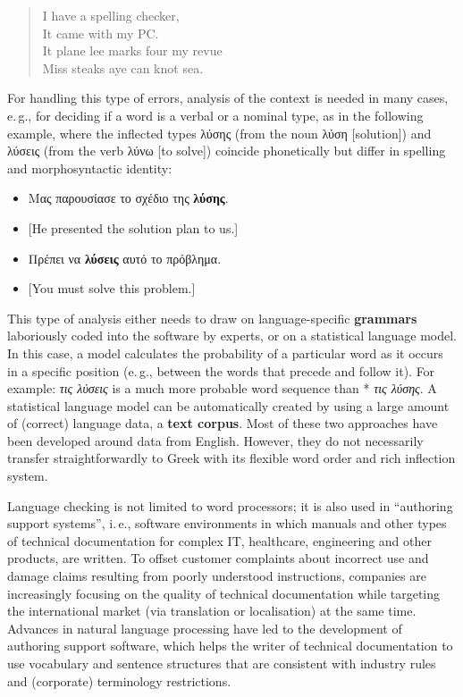 \documentclass[]{../../metanetpaper}
\begin{document}
\begin{multicols}{2}
\begin{quote}
  I have a spelling checker,\\
  It came with my PC.\\
  It plane lee marks four my revue\\
  Miss steaks aye can knot sea.
\end{quote}

For handling this type of errors, analysis of the context is needed in many cases, e.\,g., for deciding if a word is a verbal or a nominal type, as in the following example, where the inflected types λύσης (from the noun λύση [solution]) and λύσεις (from the verb λύνω [to solve]) coincide phonetically but differ in spelling and morphosyntactic identity:

\begin{itemize}
\item Μας παρουσίασε το σχέδιο της \textbf{λύσης}.
\item {[}He presented the solution plan to us.{]} 
\item Πρέπει να \textbf{λύσεις } αυτό το πρόβλημα.
\item {[}You must solve this problem.{]}
\end{itemize}

This type of analysis either needs to draw on language-specific \textbf{grammars} laboriously coded into the software by experts, or on a statistical language model. In this case, a model calculates the probability of a particular word as it occurs in a specific position (e.\,g., between the words that precede and follow it). For example: \textit{τις λύσεις} is a much more probable word sequence than * \textit{τις λύσης}. A statistical language model can be automatically created by using a large amount of (correct) language data, a \textbf{text corpus}. Most of these two approaches have been developed around data from English. However, they do not necessarily transfer straightforwardly to Greek with its flexible word order and rich inflection system.


Language checking is not limited to word processors; it is also used in “authoring support systems”, i.\,e., software environments in which manuals and other types of technical documentation for complex IT, healthcare, engineering and other products, are written. To offset customer complaints about incorrect use and damage claims resulting from poorly understood instructions, companies are increasingly focusing on the quality of technical documentation while targeting the international market (via translation or localisation) at the same time. Advances in natural language processing have led to the development of authoring support software, which helps the writer of technical documentation to use vocabulary and sentence structures that are consistent with industry rules and (corporate) terminology restrictions.


\end{multicols}
\end{document}
